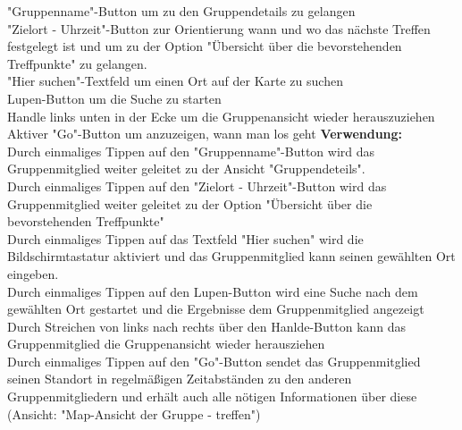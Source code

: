 "Gruppenname"-Button um zu den Gruppendetails zu gelangen\\
"Zielort - Uhrzeit"-Button zur Orientierung wann und wo das nächste Treffen festgelegt ist und um zu der Option "Übersicht über die bevorstehenden Treffpunkte" zu gelangen.\\
"Hier suchen"-Textfeld um einen Ort auf der Karte zu suchen\\
Lupen-Button um die Suche zu starten\\
Handle links unten in der Ecke um die Gruppenansicht wieder herauszuziehen\\
Aktiver "Go"-Button um anzuzeigen, wann man los geht
\textbf{Verwendung:}\\
Durch einmaliges Tippen auf den "Gruppenname"-Button wird das Gruppenmitglied weiter geleitet zu der Ansicht "Gruppendeteils".\\
Durch einmaliges Tippen auf den "Zielort - Uhrzeit"-Button wird das Gruppenmitglied weiter geleitet zu der Option "Übersicht über die bevorstehenden Treffpunkte"\\
Durch einmaliges Tippen auf das Textfeld "Hier suchen" wird die Bildschirmtastatur aktiviert und das Gruppenmitglied kann seinen gewählten Ort eingeben.\\
Durch einmaliges Tippen auf den Lupen-Button wird eine Suche nach dem gewählten Ort gestartet und die Ergebnisse dem Gruppenmitglied angezeigt\\
Durch Streichen von links nach rechts über den Hanlde-Button kann das Gruppenmitglied die Gruppenansicht wieder herausziehen\\
Durch einmaliges Tippen auf den "Go"-Button sendet das Gruppenmitglied seinen Standort in regelmäßigen Zeitabständen zu den anderen Gruppenmitgliedern und erhält auch alle nötigen Informationen über diese (Ansicht: "Map-Ansicht der Gruppe - treffen")\\ \\

